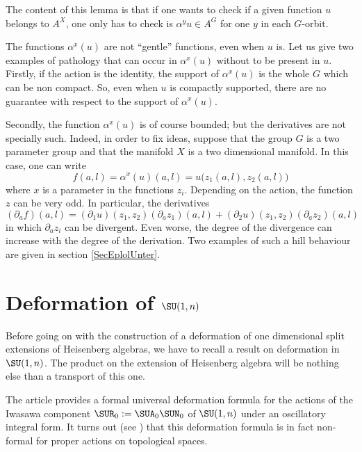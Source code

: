 The content of this lemma is that if one wants to check if a given function $u$ belongs to $A^{X}$, one only has to check is $\alpha^yu\in A^{G}$ for one $y$ in each $G$-orbit.


The functions $\alpha^x(u)$ are not ``gentle'' functions, even when $u$ is. Let us give two examples of pathology that can occur in $\alpha^x(u)$ without to be present in $u$. Firstly,  if the action is the identity, the support of $\alpha^x(u)$ is the whole $G$ which can be non compact. So, even when $u$ is compactly supported, there are no guarantee with respect to the support of $\alpha^x(u)$. 

Secondly, the function $\alpha^x(u)$ is of course bounded; but the derivatives are not specially such. Indeed, in order to fix ideas, suppose that the group $G$ is a two parameter group and that the manifold $X$ is a two dimensional manifold. In this case, one can write
\begin{equation}		\label{EqDefziDefA}
  f(a,l)=\alpha^x(u)(a,l)=u\big( z_1(a,l),z_2(a,l) \big)
\end{equation}
where $x$ is a parameter in the functions $z_i$. Depending on the action, the function $z$ can be very odd. In particular, the derivatives
\[ 
  (\partial_af)(a,l)=(\partial_1u)(z_1,z_2)(\partial_az_1)(a,l)+(\partial_2u)(z_1,z_2)(\partial_az_2)(a,l)
\]
in which $\partial_az_i$ can be divergent. Even worse, the degree of the divergence can increase with the degree of the derivation. Two examples of such a hill behaviour are given in section \ref{SecEplolUnter}. 

\section{Deformation of \texorpdfstring{$\SU(1,n)$}{SU1n}}   \label{SecDefSURme}

Before going on with the construction of a deformation of one dimensional split extensions of Heisenberg algebras, we have to recall a result on deformation in $\SU(1,n)$. The product on the extension of Heisenberg algebra will be nothing else than a transport of this one.

The article \cite{Biel-Massar} provides a formal universal deformation formula for the actions of the Iwasawa component $\SUR_0:=\SUA_0\SUN_0$ of $\SU(1,n)$ under an oscillatory integral form.  It turns out (see \cite{lcBBM}) that this deformation formula is in fact non-formal for proper actions on topological spaces. 

